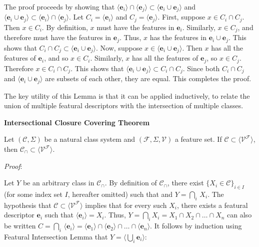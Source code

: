 \documentclass[11pt, oneside]{article}   	%
\begin{document}
The proof proceeds by showing that $ \langle \mathbf{e}_i \rangle \cap \langle \mathbf{e}_j \rangle \subset \langle \mathbf{e}_i \cup \mathbf{e}_j \rangle$ and $\langle \mathbf{e}_i \cup \mathbf{e}_j \rangle \subset  \langle \mathbf{e}_i \rangle \cap \langle \mathbf{e}_j \rangle$.
Let $C_i = \langle \mathbf{e}_i \rangle$ and $C_j = \langle \mathbf{e}_j \rangle$.
First, suppose $x \in C_i \cap C_j$. Then $x \in C_i$. By definition, $x$ must have the features in $\mathbf{e}_i$.
Similarly, $x \in C_j$, and therefore must have the features in $\mathbf{e}_j$.
Thus, $x$ has the features in $\mathbf{e}_i \cup \mathbf{e}_j$. This shows that $C_i \cap C_j \subset \langle \mathbf{e}_i \cup \mathbf{e}_j \rangle$.
Now, suppose $x \in \langle \mathbf{e}_i \cup \mathbf{e}_j \rangle$. Then $x$ has all the features of $\mathbf{e}_i$, and so $x \in C_i$.
Similarly, $x$ has all the features of $\mathbf{e}_j$, so $x \in C_j$. Therefore $x \in C_i \cap C_j$. This shows that $\langle \mathbf{e}_i \cup \mathbf{e}_j \rangle \subset C_i \cap C_j$.
Since both $C_i \cap C_j$ and $\langle \mathbf{e}_i \cup \mathbf{e}_j \rangle$ are subsets of each other, they are equal.
This completes the proof.

\vspace{\baselineskip} \noindent The key utility of this Lemma is that it can be applied inductively, to relate the union of multiple featural descriptors with the intersection of multiple classes.

\vspace{\baselineskip} \noindent \textbf{Intersectional Closure Covering Theorem}

Let $(\mathcal C, \Sigma)$ be a natural class system and $(\mathcal F, \Sigma, \mathcal V)$ a feature set. If $\mathcal C \subset \langle \mathcal V^\mathcal F \rangle$, then $\mathcal C_\cap \subset\langle \mathcal V^\mathcal F \rangle $.

\vspace{\baselineskip} \noindent \textit{Proof}:

Let $Y$ be an arbitrary class in $\mathcal C_\cap$. By definition of $\mathcal C_\cap$, there exist $\{X_i \in \mathcal C\}_{i \in I}$ (for some index set $I$, hereafter omitted) such that and $Y = \bigcap_i \, X_i$. The hypothesis that $\mathcal C \subset \langle \mathcal V^\mathcal F \rangle $ implies that for every such $X_i$, there exists a featural descriptor $\mathbf{e}_i$ such that $\langle \mathbf{e}_i \rangle = X_i$. Thus, $Y = \bigcap_i X_i = X_1 \cap X_2 \cap \ldots \cap X_n$ can also be written $C = \bigcap_i \, \langle \mathbf{e}_i \rangle = \langle \mathbf{e}_1 \rangle \cap \langle \mathbf{e}_2 \rangle \cap \ldots \cap \langle \mathbf{e}_n \rangle$. It follows by induction using Featural Intersection Lemma that $Y = \langle \bigcup_i \mathbf{e}_i \rangle$:
\end{document}
